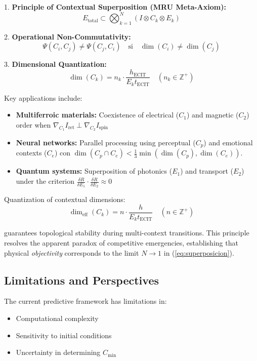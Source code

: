 \documentclass{article}
\begin{document}
1. \textbf{Principle of Contextual Superposition (MRU Meta-Axiom):}
\begin{equation}
E_{\text{total}} \subset \bigotimes_{k=1}^N (I \otimes C_k \otimes E_k)
\end{equation}

2. \textbf{Operational Non-Commutativity:}
\begin{equation}
\Psi(C_i,C_j) \neq \Psi(C_j,C_i) \quad \text{si} \quad \dim(C_i) \neq \dim(C_j)
\end{equation}

3. \textbf{Dimensional Quantization:}
\begin{equation}
\dim(C_k) = n_k \cdot \frac{h_{\text{ECIT}}}{E_k t_{\text{ECIT}}} \quad (n_k \in \mathbb{Z}^+)
\end{equation}


Key applications include:

\begin{itemize}
\item \textbf{Multiferroic materials:} Coexistence of electrical ($C_1$) and magnetic ($C_2$) order when $\nabla_{C_1}I_{\text{ret}} \perp \nabla_{C_2}I_{\text{spin}}$

\item \textbf{Neural networks:} Parallel processing using perceptual ($C_p$) and emotional contexts ($C_e$) con $\dim(C_p \cap C_e) < \frac{1}{3}\min(\dim(C_p), \dim(C_e))$.

\item \textbf{Quantum systems:} Superposition of photonics ($E_1$) and transport ($E_2$) under the criterion $\frac{\delta R}{\delta E_1} \cdot \frac{\delta R}{\delta E_2} \approx 0$
\end{itemize}

Quantization of contextual dimensions:
\begin{equation} \label{eq:cuantizacion}
\dim_{\text{eff}}(C_k) = n \cdot \frac{h}{E_k t_{\text{ECIT}}} \quad (n \in \mathbb{Z}^+)
\end{equation}

guarantees topological stability during multi-context transitions. This principle resolves the apparent paradox of competitive emergencies, establishing that physical \textit{objectivity} corresponds to the limit $N \to 1$ in (\ref{eq:superposicion}).


\subsection{Limitations and Perspectives}
The current predictive framework has limitations in:
\begin{itemize}
\item Computational complexity
\item Sensitivity to initial conditions
\item Uncertainty in determining $C_{\text{min}}$
\end{itemize}
\end{document}
